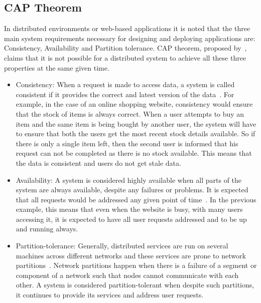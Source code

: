 \subsection{CAP Theorem} \label{ss:cap}
In distributed environments or web-based applications it is noted that the three
main system requirements necessary for designing and deploying applications are:
Consistency,   Availability and Partition tolerance.  CAP theorem,
proposed by~\citet{Brewer}, claims that it is not possible for a distributed system to
achieve all these three properties at the same given time.

\begin{itemize}
  
	\item Consistency: When a request is made to access data,   a system is called
	consistent if it provides the correct and latest version of the
	data~\citep{Tai,browne,hp,Ramakrishnan,Wada}.  For example, in the case of an
	online shopping website, consistency would ensure that the stock of items is
	always correct.  When a user attempts to buy an item and the same item is being
	bought by another user,   the system will have to ensure that both the users get
	the most recent stock details available.  So if there is only a single item
	left,   then the second user is informed that his request can not be completed
	as there is no stock available. This means that the data is consistent and users
	do not get stale data.
		
	\item Availability: A system is considered highly available when all parts of
	the system are always available, despite any failures or problems.  It is
	expected that all requests would be addressed any given point of
	time~\citep{Tai,browne,Ramakrishnan,Wada}.  In the previous example,   this
	means that even when the website is busy,   with many users accessing it,   it
	is expected to have all user requests addressed and to be up and running always.
			
	\item Partition-tolerance: Generally, distributed services are run on several
	machines across different networks and these services are prone to network
	partitions~\citep{Brewer,Gilbert,Ramakrishnan}. Network partitions happen when
	there is a failure of a segment or component of a network such that nodes cannot
	communicate with each other.
	A system is considered  partition-tolerant when despite such partitions,   it
	continues to provide its services and address user requests.
	
\end{itemize}

